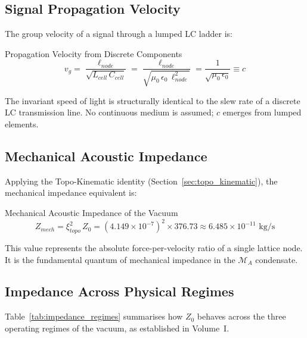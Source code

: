 \subsection{Signal Propagation Velocity}

The group velocity of a signal through a lumped LC ladder is:
\begin{resultbox}{Propagation Velocity from Discrete Components}
\begin{equation}
    v_g = \frac{\ell_{node}}{\sqrt{L_{cell}\, C_{cell}}} = \frac{\ell_{node}}{\sqrt{\mu_0\, \epsilon_0\, \ell_{node}^2}} = \frac{1}{\sqrt{\mu_0\, \epsilon_0}} \equiv c
    \label{eq:c_from_lc}
\end{equation}
\end{resultbox}

The invariant speed of light is structurally identical to the slew rate of a discrete LC transmission line. No continuous medium is assumed; $c$ emerges from lumped elements.

\subsection{Mechanical Acoustic Impedance}

Applying the Topo-Kinematic identity (Section~\ref{sec:topo_kinematic}), the mechanical impedance equivalent is:
\begin{resultbox}{Mechanical Acoustic Impedance of the Vacuum}
\begin{equation}
    Z_{mech} = \xi_{topo}^{2}\, Z_0 = (4.149 \times 10^{-7})^2 \times 376.73 \approx 6.485 \times 10^{-11} \text{ kg/s}
    \label{eq:z_mech}
\end{equation}
\end{resultbox}

This value represents the absolute force-per-velocity ratio of a single lattice node. It is the fundamental quantum of mechanical impedance in the $\mathcal{M}_A$ condensate.

\subsection{Impedance Across Physical Regimes}

Table~\ref{tab:impedance_regimes} summarises how $Z_0$ behaves across the three operating regimes of the vacuum, as established in Volume~I.

